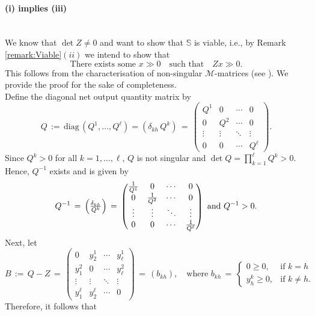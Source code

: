 \documentclass[11pt,fleqn]{article}
\begin{document}
\paragraph{(i) implies (iii)} \ \ \\
We know that $\det Z\neq 0$ and want to show that $\mathbb S$ is viable, i.e., by Remark \ref{remark:Viable}$(ii)$ we intend to show that
\begin{equation} \label{eq:star}
\mbox{There exists some } x\gg 0 \quad\text{such that}\quad Zx \gg 0.
\end{equation}
This follows from the characterisation of non-singular $\mathcal{M}$-matrices (see \citet{Berman1994}). We provide the proof for the sake of completeness.
\\
Define the diagonal net output quantity matrix by
\[
Q \, :=\,  \mbox{diag} \, \left( Q^1, \ldots ,Q^\ell \right) = (\delta_{kh}\,Q^{k}) \, =\, 
\begin{pmatrix}
Q^{1} & 0 & \cdots & 0 \\
0 & Q^{2} & \cdots & 0 \\
\vdots & \vdots & \ddots & \vdots \\
0 & 0 & \cdots & Q^{\ell}
\end{pmatrix}. 
\]
Since $Q^{k}>0$ for all $k=1,\ldots,\ell$, $Q$ is not singular and  $\det Q = \prod_{k=1}^{\ell} Q^{k} > 0$. Hence, $Q^{-1}$ exists and is given by
\[
Q^{-1} \, =\,  \Bigl(  \tfrac{\delta_{kh}}{Q^{k}} \Bigr) \, =\, 
\begin{pmatrix}
\tfrac{1}{Q^{1}} & 0 & \cdots & 0 \\
0 & \tfrac{1}{Q^{2}} & \cdots & 0 \\
\vdots & \vdots & \ddots & \vdots \\
0 & 0 & \cdots & \tfrac{1}{Q^{\ell}}
\end{pmatrix}
\,\,\mbox{and}\,\,Q^{-1} > 0.
\]
Next, let
\[
B \, :=\,  Q - Z \, =\, 
\begin{pmatrix}
0 & y^1_{2} & \cdots & y^1_{\ell} \\
y^2_{1} & 0 & \cdots & y^2_{\ell} \\
\vdots & \vdots & \ddots  & \vdots  \\
y^{\ell}_1 & y^{\ell}_2 & \cdots & 0
\end{pmatrix}
\, =\,  (b_{kh}),\quad \mbox{where }
b_{kh} \, =\, 
\begin{cases} 
0\geqslant 0, & \text{if } k=h\\ 
y^k_{h}\geqslant 0, & \text{if } k\neq h. 
\end{cases}
\]
Therefore, it follows that
\end{document}
